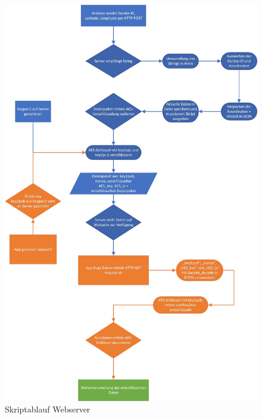 \begin{figure} [H]
	\begin{center}
		\includegraphics[width=1\textwidth]{Bilder/Webserver_pap2.jpg}
		\caption{Skriptablauf Webserver}
		\label{server-script}
	\end{center}
\end{figure}

